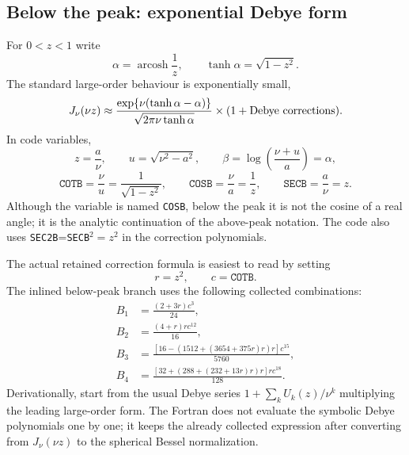 \documentclass[11pt,a4paper]{article}
\newcommand{\code}[1]{\texttt{#1}}
\begin{document}
\subsection{Below the peak: exponential Debye form}

For $0<z<1$ write
\begin{equation}
  \alpha=\operatorname{arcosh}\frac{1}{z},\qquad
  \tanh\alpha=\sqrt{1-z^2}.
\end{equation}
The standard large-order behaviour is exponentially small,
\begin{equation}
  J_\nu(\nu z) \approx
  \frac{\exp\{\nu(\tanh\alpha-\alpha)\}}
       {\sqrt{2\pi\nu\tanh\alpha}}\times(1+\hbox{Debye corrections}).
\end{equation}
In code variables,
\begin{equation}
  z=\frac{a}{\nu},\qquad
  u=\sqrt{\nu^2-a^2},\qquad
  \beta=\log\left(\frac{\nu+u}{a}\right)=\alpha,
\end{equation}
\begin{equation}
  \code{COTB}=\frac{\nu}{u}=\frac{1}{\sqrt{1-z^2}},
  \qquad
  \code{COSB}=\frac{\nu}{a}=\frac{1}{z},
  \qquad
  \code{SECB}=\frac{a}{\nu}=z .
\end{equation}
Although the variable is named \code{COSB}, below the peak it is not the cosine of a real angle; it is the analytic continuation of the above-peak notation.
The code also uses \code{SEC2B}=\code{SECB}$^2=z^2$ in the correction polynomials.

The actual retained correction formula is easiest to read by setting
\begin{equation}
  r=z^2,\qquad c=\code{COTB}.
\end{equation}
The inlined below-peak branch uses the following collected combinations:
\begin{align}
  B_1 &= \frac{(2+3r)c^3}{24},\\
  B_2 &= \frac{(4+r)r c^{12}}{16},\\
  B_3 &= \frac{\left[16-\left(1512+(3654+375r)r\right)r\right]c^{15}}{5760},\\
  B_4 &= \frac{\left[32+\left(288+(232+13r)r\right)r\right]r c^{18}}{128}.
  \label{eq:below-debye-polys}
\end{align}
Derivationally, start from the usual Debye series
$1+\sum_k U_k(z)/\nu^k$ multiplying the leading large-order form.  The
Fortran does not evaluate the symbolic Debye polynomials one by one; it keeps
the already collected expression after converting from $J_\nu(\nu z)$ to the
spherical Bessel normalization.
\end{document}
